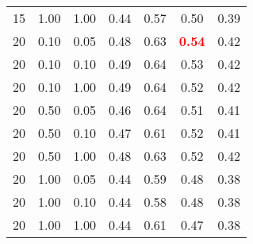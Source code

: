 \begin{tabular}{lllcccc}
15 & 1.00 & 1.00 & 0.44 & 0.57 & 0.50 & 0.39 \\ 
20 & 0.10 & 0.05 & 0.48 & 0.63 & \textbf{\textcolor{red}{0.54}} & 0.42 \\ 
20 & 0.10 & 0.10 & 0.49 & 0.64 & 0.53 & 0.42 \\ 
20 & 0.10 & 1.00 & 0.49 & 0.64 & 0.52 & 0.42 \\ 
20 & 0.50 & 0.05 & 0.46 & 0.64 & 0.51 & 0.41 \\ 
20 & 0.50 & 0.10 & 0.47 & 0.61 & 0.52 & 0.41 \\ 
20 & 0.50 & 1.00 & 0.48 & 0.63 & 0.52 & 0.42 \\ 
20 & 1.00 & 0.05 & 0.44 & 0.59 & 0.48 & 0.38 \\ 
20 & 1.00 & 0.10 & 0.44 & 0.58 & 0.48 & 0.38 \\ 
20 & 1.00 & 1.00 & 0.44 & 0.61 & 0.47 & 0.38 \\ 
\end{tabular} 
